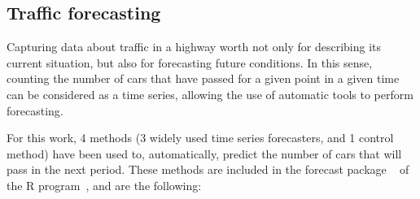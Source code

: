\subsection{Traffic forecasting}
\label{sub:ts_forecasting}
Capturing data about traffic in a highway worth not only for describing its current situation, but also for forecasting future conditions. In this sense, counting the number of cars that have passed for a given point in a given time can be considered as a time series, allowing the use of automatic tools to perform forecasting.

For this work, 4 methods (3 widely used time series forecasters, and 1 control method) have been used to, automatically, predict the number of cars that will pass in the next period. These methods are included in the forecast package ~\cite{Hyndman08automatictime} of the R program~\cite{R:Bloomfield:2014}, and are the following:

